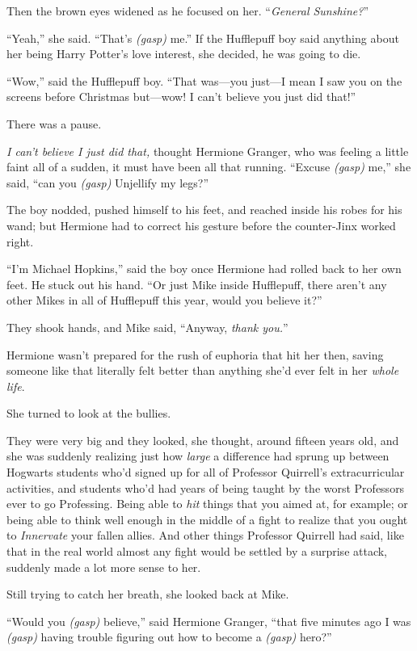Then the brown eyes widened as he focused on her. “\emph{General Sunshine?}”

“Yeah,” she said.
“That’s \emph{(gasp)} me.” If the Hufflepuff boy said anything about her being Harry Potter’s love interest, she decided, he was going to die.

“Wow,” said the Hufflepuff boy.
“That was—you just—I mean I saw you on the screens before Christmas but—wow! I can’t believe you just did that!”

There was a pause.

\emph{I can’t believe I just did that,} thought Hermione Granger, who was feeling a little faint all of a sudden, it must have been all that running.
“Excuse \emph{(gasp)} me,” she said, “can you \emph{(gasp)} Unjellify my legs?”

The boy nodded, pushed himself to his feet, and reached inside his robes for his wand; but Hermione had to correct his gesture before the counter-Jinx worked right.

“I’m Michael Hopkins,” said the boy once Hermione had rolled back to her own feet. He stuck out his hand.
“Or just Mike inside Hufflepuff, there aren’t any other Mikes in all of Hufflepuff this year, would you believe it?”

They shook hands, and Mike said,
“Anyway, \emph{thank you.}”

Hermione wasn’t prepared for the rush of euphoria that hit her then, saving someone like that literally felt better than anything she’d ever felt in her \emph{whole life}.

She turned to look at the bullies.

They were very big and they looked, she thought, around fifteen years old, and she was suddenly realizing just how \emph{large} a difference had sprung up between Hogwarts students who’d signed up for all of Professor Quirrell’s extracurricular activities, and students who’d had years of being taught by the worst Professors ever to go Professing. Being able to \emph{hit} things that you aimed at, for example; or being able to think well enough in the middle of a fight to realize that you ought to \emph{Innervate} your fallen allies. And other things Professor Quirrell had said, like that in the real world almost any fight would be settled by a surprise attack, suddenly made a lot more sense to her.

Still trying to catch her breath, she looked back at Mike.

“Would you \emph{(gasp)} believe,” said Hermione Granger, “that five minutes ago I was \emph{(gasp)} having trouble figuring out how to become a \emph{(gasp)} hero?”

